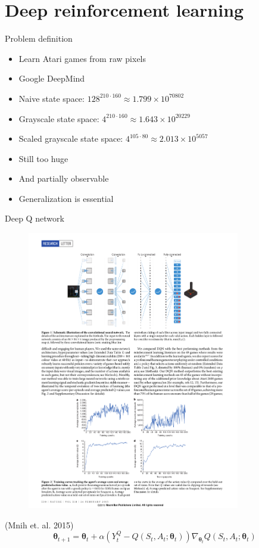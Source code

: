 \documentclass{beamer}
\begin{document}
\section{Deep reinforcement learning}

\begin{frame}{Problem definition}
  \begin{itemize}
  \item {
    Learn Atari games from raw pixels
  }
  \item {
    Google DeepMind
  }
  \item {
      Naive state space: $128^{210 \cdot 160} \approx 1.799\times 10^{70802}$
  }
  \item {
      Grayscale state space: $4^{210 \cdot 160} \approx 1.643\times 10^{20229}$
  }
  \item {
      Scaled grayscale state space: $4^{105 \cdot 80} \approx 2.013\times 10^{5057}$
  }
  \item {
    Still too huge
  }
  \item {
    And partially observable
  }
  \item {
    Generalization is essential
  }
  \end{itemize}
\end{frame}

\begin{frame}{Deep Q network}
  \begin{figure}[H]
    \centering
    \includegraphics[width=93mm]{deep_q_network.pdf}
  \end{figure}
  (Mnih et. al. 2015)
  \[ \boldsymbol{\theta}_{t+1} = \boldsymbol{\theta}_t+\alpha(Y_t^Q-Q(S_t,A_t;\boldsymbol{\theta}_t))\nabla_{\boldsymbol{\theta}_t}Q(S_t,A_t;\boldsymbol{\theta}_t) \]
\end{frame}
\end{document}
